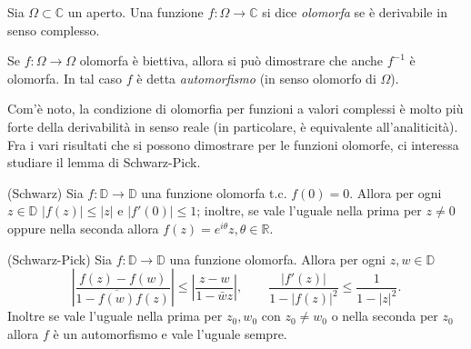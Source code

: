 
\begin{defn}
  Sia $\Omega \subset \mathbb{C}$ un aperto. Una funzione $f:\Omega \longrightarrow \mathbb{C}$ si dice \textit{olomorfa} se è derivabile in senso complesso.
\end{defn}

\begin{oss}
  Se $f: \Omega \longrightarrow \Omega$ olomorfa è biettiva, allora si può dimostrare che anche $f^{-1}$ è olomorfa. In tal caso $f$ è detta \textit{automorfismo} (in senso olomorfo di $\Omega$).
\end{oss}

Com'è noto, la condizione di olomorfia per funzioni a valori complessi è molto più forte della derivabilità in senso reale (in particolare, è equivalente all'analiticità). Fra i vari risultati che si possono dimostrare per le funzioni olomorfe, ci interessa studiare il lemma di Schwarz-Pick.

\begin{lm}
  (Schwarz) Sia $f:\mathbb{D} \longrightarrow \mathbb{D}$ una funzione olomorfa t.c. $f(0)=0$. Allora per ogni $z \in \mathbb{D}$ $|f(z)| \le |z|$ e $|f'(0)| \le 1$; inoltre, se vale l'uguale nella prima per $z \not=0$ oppure nella seconda allora $f(z)=e^{i\theta}z, \theta \in \mathbb{R}$.
\end{lm}

\begin{lm}
  (Schwarz-Pick) Sia $f:\mathbb{D} \longrightarrow \mathbb{D}$ una funzione olomorfa.
  Allora per ogni $z, w \in \mathbb{D}$
  $$\left|\frac{f(z)-f(w)}{1-\overline{f(w)}f(z)}\right| \le \left|\frac{z-w}{1-\bar{w}z}\right|, \qquad \frac{|f'(z)|}{1-|f(z)|^2} \le \frac{1}{1-|z|^2}.$$
  Inoltre se vale l'uguale nella prima per $z_0, w_0$ con $z_0 \not=w_0$ o nella seconda per $z_0$ allora $f$ è un automorfismo e vale l'uguale sempre.
\end{lm}
